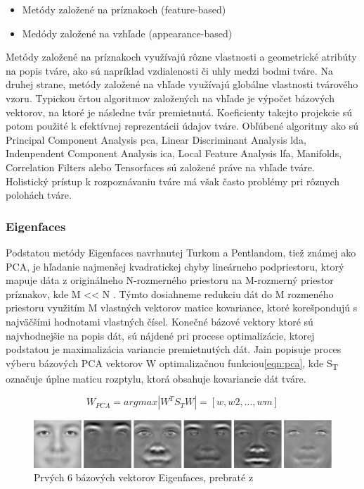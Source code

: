 \begin{itemize}
	\item Metódy založené na príznakoch (feature-based)
	\item Medódy založené na vzhľade (appearance-based)
\end{itemize}

Metódy založené na príznakoch využívajú rôzne vlastnosti a geometrické atribúty na popis tváre, ako sú napríklad vzdialenosti či uhly medzi bodmi tváre.
Na druhej strane, metódy založené na vhľade využívajú globálne vlastnosti tvárového vzoru.
Typickou črtou algoritmov založených na vhľade je výpočet bázových vektorov, na ktoré je následne tvár premietnutá.
Koeficienty takejto projekcie sú potom použité k efektívnej reprezentácii údajov tváre\cite{handbookbio}.
Obľúbené algoritmy ako sú Principal Component Analysis \acrshort{pca}, Linear Discriminant Analysis \acrshort{lda}, Indenpendent Component Analysis \acrshort{ica},
Local Feature Analysis \acrshort{lfa}, Manifolds, Correlation Filters alebo Tensorfaces sú založené práve na vhľade tváre.
Holistický prístup k rozpoznávaniu tváre má však často problémy pri rôznych polohách tváre\cite{handbookbio}.

\subsubsection{Eigenfaces}
Podstatou metódy Eigenfaces navrhnutej Turkom a Pentlandom\cite{turk1991eigenfaces}, tiež známej ako PCA,
je hľadanie najmenšej kvadratickej chyby lineárneho podpriestoru,
ktorý mapuje dáta z originálneho N-rozmerného priestoru na M-rozmerný priestor príznakov, kde M << N .
Týmto dosiahneme redukciu dát do M rozmeného priestoru využitím M vlastných vektorov matice kovariance, ktoré korešpondujú s najväčšími hodnotami vlastných čísel\cite{handbookbio}.
Konečné bázové vektory ktoré sú najvhodnejšie na popis dát, sú nájdené pri procese optimalizácie, ktorej podstatou je  maximalizácia variancie premietnutých dát.
Jain popisuje\cite{handbookbio} proces výberu bázových PCA vektorov W optimalizačnou funkciou\eqref{eqn:pca}, kde S\textsubscript{T} označuje úplne maticu rozptylu,
ktorá obsahuje kovariancie dát tváre.


\begin{equation}\label{eqn:pca}
	W_{PCA} = arg max|W^T S_T W| = [w, w2,\dots,wm]
\end{equation}

\begin{figure}[H]
	\centering
	\includegraphics[width=1\linewidth]{img/eigenfaces}
	\caption{Prvých 6 bázových vektorov Eigenfaces, prebraté z\cite[p.~45]{handbookbio}}
	\label{fig:eigenfaces}
\end{figure}

